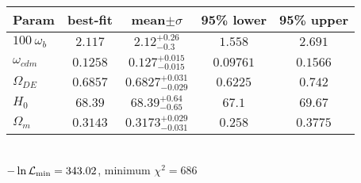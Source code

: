 \begin{tabular}{|l|c|c|c|c|} 
 \hline 
Param & best-fit & mean$\pm\sigma$ & 95\% lower & 95\% upper \\ \hline 
$100~\omega_{b }$ &$2.117$ & $2.12_{-0.3}^{+0.26}$ & $1.558$ & $2.691$ \\ 
$\omega_{cdm }$ &$0.1258$ & $0.127_{-0.015}^{+0.015}$ & $0.09761$ & $0.1566$ \\ 
$\Omega_{DE}$ &$0.6857$ & $0.6827_{-0.029}^{+0.031}$ & $0.6225$ & $0.742$ \\ 
$H_{0 }$ &$68.39$ & $68.39_{-0.65}^{+0.64}$ & $67.1$ & $69.67$ \\ 
$\Omega_{m }$ &$0.3143$ & $0.3173_{-0.031}^{+0.029}$ & $0.258$ & $0.3775$ \\ 
\hline 
 \end{tabular} \\ 
$-\ln{\cal L}_\mathrm{min} =343.02$, minimum $\chi^2=686$ \\ 
